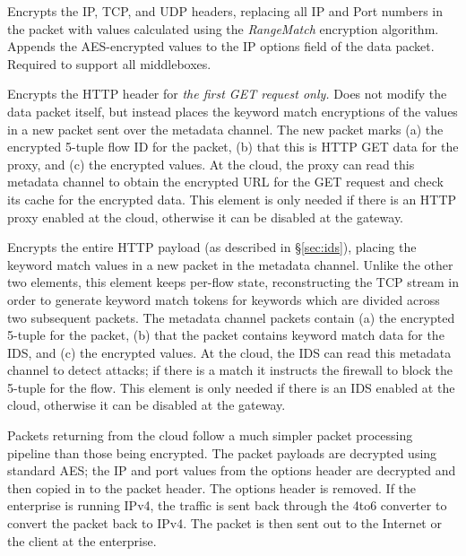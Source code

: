  Encrypts the IP, TCP, and UDP headers, replacing all IP and Port numbers in the packet with values calculated using the {\it RangeMatch} encryption algorithm. Appends the AES-encrypted values to the IP options field of the data packet.
Required to support all middleboxes. 

 Encrypts the HTTP header for {\it the first GET request only.} Does not modify the data packet itself, but instead places the keyword match encryptions of the values in a new packet sent over the metadata channel. %
The new packet marks (a) the encrypted 5-tuple flow ID for the packet, (b) that this is HTTP GET data for the proxy, and (c) the encrypted values. At the cloud, the proxy can read this metadata channel to obtain the encrypted URL for the GET request and check its cache for the encrypted data. This element is only needed if there is an HTTP proxy enabled at the cloud, otherwise it can be disabled at the gateway.

 Encrypts the entire HTTP payload (as described in \S\ref{sec:ids}), placing the keyword match values in a new packet in the metadata channel. Unlike the other two elements, this element keeps per-flow state, reconstructing the TCP stream in order to generate keyword match tokens for keywords which are divided across two subsequent packets.  The metadata channel packets contain (a) the encrypted 5-tuple for the packet, (b) that the packet contains keyword match data for the IDS, and (c) the encrypted values. At the cloud, the IDS can read this metadata channel to detect attacks; if there is a match it instructs the firewall to block the 5-tuple for the flow. This element is only needed if there is an IDS enabled at the cloud, otherwise it can be disabled at the gateway.


 Packets returning from the cloud follow a much simpler packet processing pipeline than those being encrypted.
The packet payloads are decrypted using standard AES; the IP and port values from the options header are decrypted and then copied in to the packet header. The options header is removed.
If the enterprise is running IPv4, the traffic is sent back through the 4to6 converter to convert the packet back to IPv4.
The packet is then sent out to the Internet or the client at the enterprise.


